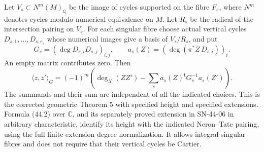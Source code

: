 \documentclass[11pt,a4paper]{article}
\theoremstyle{definition}
\theoremstyle{remark}
\begin{document}
Let $V_s\subset N^m(M)_{\mathbb Q}$ be the image of cycles supported
on the fibre $F_s$, where $N^m$ denotes cycles modulo numerical
equivalence on $M$.  Let $R_s$ be the radical of the intersection
pairing on $V_s$.  For each singular fibre choose actual vertical
cycles $D_{s,1},\ldots,D_{s,r_s}$ whose numerical images give a basis
of $V_s/R_s$, and put
\[
 G_s=(\deg D_{s,i}D_{s,j})_{i,j},\qquad
 a_s(Z)=(\deg(\pi^*Z\,D_{s,i}))_i.
\]
An empty matrix contributes zero.  Then
\[
 \boxed{\quad
 \langle z,z'\rangle_G
 =(-1)^m\left(\deg_X(ZZ')
       -\sum_s a_s(Z)^{\mathsf t}G_s^{-1}a_s(Z')\right).
 \quad}                                                     \tag{44.4}
 \label{eq:44-corrected}
\]
The summands and their sum are independent of all the indicated
choices.  This is the corrected geometric Theorem 5 with specified
height and specified extensions.  Formula (44.2) over $\mathbb C$,
and its separately proved extension in SN-44-06 in arbitrary
characteristic, identify its height with the indicated Neron--Tate
pairing, using the full finite-extension degree normalization.
It allows integral singular fibres and does
not require that their vertical cycles be Cartier.
\end{document}
